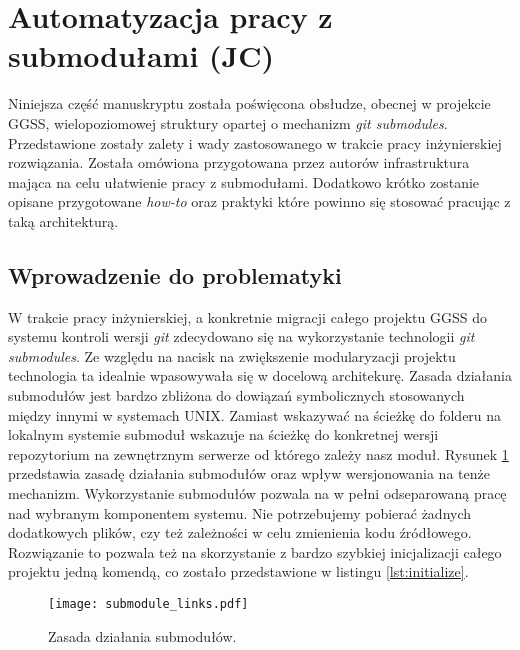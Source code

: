 \clearpage
\section{Automatyzacja pracy z submodułami (JC)}
\label{sec:gitio}

Niniejsza część manuskryptu została poświęcona obsłudze, obecnej w projekcie GGSS, wielopoziomowej struktury  opartej o mechanizm \emph{git submodules}. Przedstawione zostały zalety i wady zastosowanego w trakcie pracy inżynierskiej rozwiązania. Została omówiona przygotowana przez autorów infrastruktura mająca na celu ułatwienie pracy z submodułami. Dodatkowo krótko zostanie opisane przygotowane \emph{how-to} oraz praktyki które powinno się stosować pracując z taką architekturą.

\subsection{Wprowadzenie do problematyki}

W trakcie pracy inżynierskiej, a konkretnie migracji całego projektu GGSS do systemu kontroli wersji \emph{git} zdecydowano się na wykorzystanie technologii \emph{git submodules}. Ze względu na nacisk na zwiększenie modularyzacji projektu technologia ta idealnie wpasowywała się w docelową architekurę. Zasada działania submodułów jest bardzo zbliżona do dowiązań symbolicznych stosowanych między innymi w systemach UNIX. Zamiast wskazywać na ścieżkę do folderu na lokalnym systemie submoduł wskazuje na ścieżkę do konkretnej wersji repozytorium na zewnętrznym serwerze od którego zależy nasz moduł. Rysunek \ref{fig:submodules_links} przedstawia zasadę działania submodułów oraz wpływ wersjonowania na tenże mechanizm. Wykorzystanie submodułów pozwala na w pełni odseparowaną pracę nad wybranym komponentem systemu. Nie potrzebujemy pobierać żadnych dodatkowych plików, czy też zależności w celu zmienienia kodu źródłowego. Rozwiązanie to pozwala też na skorzystanie z bardzo szybkiej inicjalizacji całego projektu jedną komendą, co zostało przedstawione w listingu \ref{lst:initialize}.

\begin{figure}[H]
    \centering
    \texttt{[image: submodule\_links.pdf]}
    \caption{Zasada działania submodułów.}
    \label{fig:submodules_links}
\end{figure}


